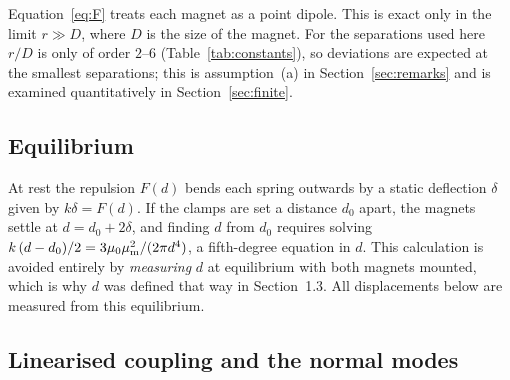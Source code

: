 Equation~\eqref{eq:F} treats each magnet as a point dipole. This is exact only in the limit $r\gg D$, where $D$ is the size of the magnet. For the separations used here $r/D$ is only of order $2$--$6$ (Table~\ref{tab:constants}), so deviations are expected at the smallest separations; this is assumption~(a) in Section~\ref{sec:remarks} and is examined quantitatively in Section~\ref{sec:finite}.

\subsection{Equilibrium}\label{sec:equilibrium}

At rest the repulsion $F(d)$ bends each spring outwards by a static deflection $\delta$ given by $k\delta=F(d)$. If the clamps are set a distance $d_0$ apart, the magnets settle at $d=d_0+2\delta$, and finding $d$ from $d_0$ requires solving $k\,(d-d_0)/2=3\mu_0\mu_{\mathrm m}^2/(2\pi d^4)$, a fifth-degree equation in $d$. This calculation is avoided entirely by \emph{measuring} $d$ at equilibrium with both magnets mounted, which is why $d$ was defined that way in Section~1.3. All displacements below are measured from this equilibrium.

\subsection{Linearised coupling and the normal modes}\label{sec:modes}

